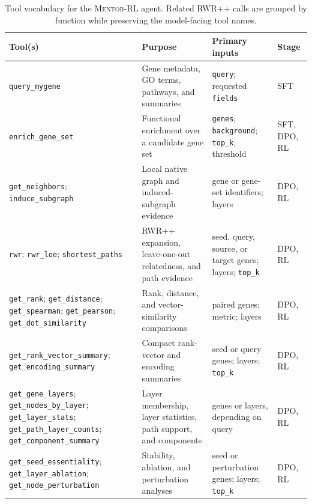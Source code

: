 \documentclass[thesis,letterpaper,12pt]{utthesis}
\begin{document}
\begin{table}[p]
\centering
\caption{Tool vocabulary for the \textsc{Mentor-RL} agent. Related RWR++ calls are grouped by function while preserving the model-facing tool names.}
\label{tbl:tools}
\scriptsize
\setlength{\tabcolsep}{3pt}
\renewcommand{\arraystretch}{0.95}
\begin{tabularx}{\textwidth}{@{}>{\raggedright\arraybackslash}p{} >{\raggedright\arraybackslash}X >{\raggedright\arraybackslash}p{} >{\raggedright\arraybackslash}p{}@{}}
\toprule
\textbf{Tool(s)} & \textbf{Purpose} & \textbf{Primary inputs} & \textbf{Stage} \\
\midrule
\texttt{query\_mygene} & Gene metadata, GO terms, pathways, and summaries & \texttt{query}; requested \texttt{fields} & SFT \\
\midrule
\texttt{enrich\_gene\_set} & Functional enrichment over a candidate gene set & \texttt{genes}; \texttt{background}; \texttt{top\_k}; threshold & SFT, DPO, RL \\
\midrule
\texttt{get\_neighbors}; \texttt{induce\_subgraph} & Local native graph and induced-subgraph evidence & gene or gene-set identifiers; layers & DPO, RL \\
\midrule
\texttt{rwr}; \texttt{rwr\_loe}; \texttt{shortest\_paths} & RWR++ expansion, leave-one-out relatedness, and path evidence & seed, query, source, or target genes; layers; \texttt{top\_k} & DPO, RL \\
\midrule
\texttt{get\_rank}; \texttt{get\_distance}; \texttt{get\_spearman}; \texttt{get\_pearson}; \texttt{get\_dot\_similarity} & Rank, distance, and vector-similarity comparisons & paired genes; metric; layers & DPO, RL \\
\midrule
\texttt{get\_rank\_vector\_summary}; \texttt{get\_encoding\_summary} & Compact rank-vector and encoding summaries & seed or query genes; layers; \texttt{top\_k} & DPO, RL \\
\midrule
\texttt{get\_gene\_layers}; \texttt{get\_nodes\_by\_layer}; \texttt{get\_layer\_stats}; \texttt{get\_path\_layer\_counts}; \texttt{get\_component\_summary} & Layer membership, layer statistics, path support, and components & genes or layers, depending on query & DPO, RL \\
\midrule
\texttt{get\_seed\_essentiality}; \texttt{get\_layer\_ablation}; \texttt{get\_node\_perturbation} & Stability, ablation, and perturbation analyses & seed or perturbation genes; layers; \texttt{top\_k} & DPO, RL \\
\bottomrule
\end{tabularx}
\end{table}
\end{document}
